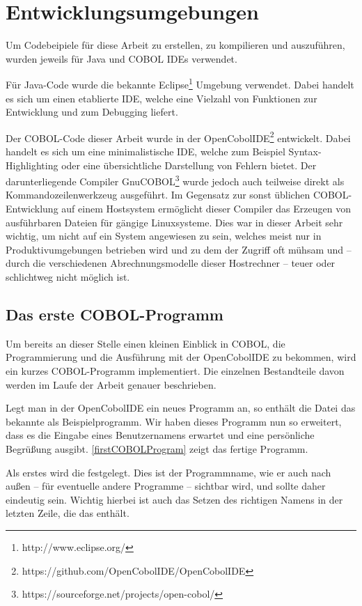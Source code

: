 \section{Entwicklungsumgebungen}
Um Codebeipiele für diese Arbeit zu erstellen, zu kompilieren und auszuführen, wurden jeweils für Java und COBOL IDEs verwendet.

Für Java-Code wurde die bekannte Eclipse\footnote{http://www.eclipse.org/} Umgebung verwendet. Dabei handelt es sich um einen etablierte IDE, welche eine Vielzahl von Funktionen zur Entwicklung und zum Debugging liefert.

Der COBOL-Code dieser Arbeit wurde in der OpenCobolIDE\footnote{https://github.com/OpenCobolIDE/OpenCobolIDE} entwickelt. Dabei handelt es sich um eine minimalistische IDE, welche zum Beispiel Syntax-Highlighting oder eine übersichtliche Darstellung von Fehlern bietet. Der darunterliegende Compiler GnuCOBOL\footnote{https://sourceforge.net/projects/open-cobol/} wurde jedoch auch teilweise direkt als Kommandozeilenwerkzeug ausgeführt. Im Gegensatz zur sonst üblichen COBOL-Entwicklung auf einem Hostsystem ermöglicht dieser Compiler das Erzeugen von ausführbaren Dateien für gängige Linuxsysteme. Dies war in dieser Arbeit sehr wichtig, um nicht auf ein System angewiesen zu sein, welches meist nur in Produktivumgebungen betrieben wird und zu dem der Zugriff oft mühsam und -- durch die verschiedenen Abrechnungsmodelle dieser Hostrechner -- teuer oder schlichtweg nicht möglich ist.

\subsection*{Das erste COBOL-Programm}

Um bereits an dieser Stelle einen kleinen Einblick in COBOL, die Programmierung und die Ausführung mit der OpenCobolIDE zu bekommen, wird ein kurzes COBOL-Programm implementiert. Die einzelnen Bestandteile davon werden im Laufe der Arbeit genauer beschrieben.


Legt man in der OpenCobolIDE ein neues Programm an, so enthält die Datei das bekannte  als Beispielprogramm. Wir haben dieses Programm nun so erweitert, dass es die Eingabe eines Benutzernamens erwartet und eine persönliche Begrüßung ausgibt. \autoref{firstCOBOLProgram} zeigt das fertige Programm.

Als erstes wird die  festgelegt. Dies ist der Programmname, wie er auch nach außen -- für eventuelle andere Programme -- sichtbar wird, und sollte daher eindeutig sein. Wichtig hierbei ist auch das Setzen des richtigen Namens in der letzten Zeile, die das  enthält.

